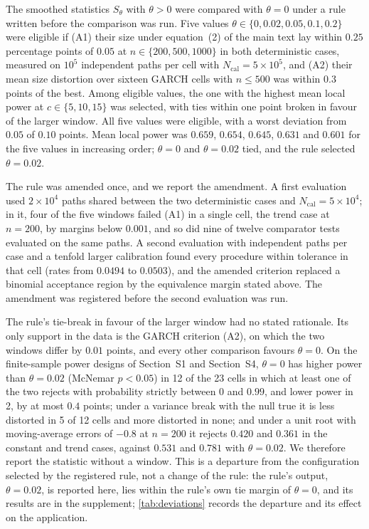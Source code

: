 \documentclass[11pt]{article}
\newcommand{\Stat}{S_\theta}
\newcommand{\ncal}{N_{\mathrm{cal}}}
\begin{document}
The smoothed statistics $\Stat$ with $\theta > 0$ were compared with
$\theta = 0$ under a rule written before the comparison was run.
Five values $\theta \in \{0, 0.02, 0.05, 0.1, 0.2\}$ were eligible if (A1)
their size under equation~(2) of the main text lay within $0.25$ percentage points of
$0.05$ at $n \in \{200, 500, 1000\}$ in both deterministic cases, measured
on $10^5$ independent paths per cell with $\ncal = 5\times10^5$, and (A2)
their mean size distortion over sixteen GARCH cells with $n \leq 500$ was
within $0.3$ points of the best. Among eligible values, the one with the
highest mean local power at $c \in \{5, 10, 15\}$ was selected, with ties
within one point broken in favour of the larger window. All five values
were eligible, with a worst deviation from $0.05$ of $0.10$ points. Mean
local power was $0.659$, $0.654$, $0.645$, $0.631$ and $0.601$ for the five
values in increasing order; $\theta = 0$ and $\theta = 0.02$ tied, and the
rule selected $\theta = 0.02$.

The rule was amended once, and we report the amendment. A first
evaluation used $2\times10^4$ paths shared between the two deterministic
cases and $\ncal = 5\times10^4$; in it, four of the five windows failed
(A1) in a single cell, the trend case at $n=200$, by margins below
$0.001$, and so did nine of twelve comparator tests evaluated on the same
paths. A second evaluation with independent paths per case and a tenfold
larger calibration found every procedure within tolerance in that cell
(rates from $0.0494$ to $0.0503$), and the amended criterion replaced a
binomial acceptance region by the equivalence margin stated above. The
amendment was registered before the second evaluation was run.

The rule's tie-break in favour of the larger window had no stated
rationale. Its only support in the data is the GARCH criterion (A2), on
which the two windows differ by $0.01$ points, and every other comparison
favours $\theta = 0$. On the finite-sample power designs of
Section~S1 and Section~S4, $\theta = 0$ has higher power than
$\theta = 0.02$ (McNemar $p < 0.05$) in 12 of the 23
cells in which at least one of the two rejects with probability strictly
between $0$ and $0.99$, and lower power in 2, by at most
$0.4$ points; under a variance break with the null true it is less
distorted in 5 of 12 cells and more distorted in none; and under a unit
root with moving-average errors of $-0.8$ at $n = 200$ it rejects $0.420$
and $0.361$ in the constant and trend cases, against $0.531$ and $0.781$
with $\theta = 0.02$. We therefore report the statistic without a window.
This is a departure from the configuration selected by the registered
rule, not a change of the rule: the rule's output, $\theta = 0.02$, is
reported here, lies within the rule's own tie margin of $\theta = 0$, and
its results are in the supplement; \cref{tab:deviations} records the
departure and its effect on the application.
\end{document}
